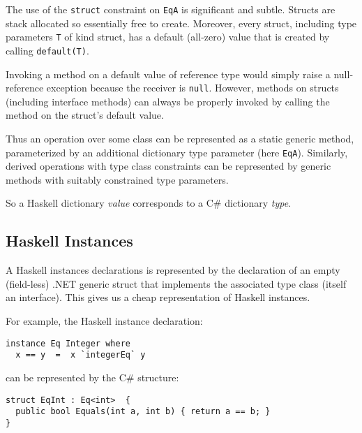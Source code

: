 \documentclass[preprint]{sig-alternate-05-2015}
\begin{document}
The use of the \lstinline{struct} constraint on \lstinline{EqA} is significant and subtle. Structs are stack allocated so essentially free to create.
Moreover, every struct, including type parameters \lstinline{T} of kind struct, has a default (all-zero) value that is created by 
calling \lstinline{default(T)}.

Invoking a method on a default value of reference type would simply raise a null-reference exception because the receiver is \lstinline{null}.
However, methods on structs (including interface methods) can always be properly invoked
by calling the method on the struct's default value. 

Thus an operation over some class can be represented as a static generic method, 
parameterized by an additional dictionary type parameter (here \lstinline{EqA}).
Similarly, derived operations with type class constraints can be represented by generic methods with suitably constrained type parameters.

So a Haskell dictionary \emph{value} corresponds to a  C\# dictionary \emph{type}.



\subsection{Haskell Instances}

A Haskell instances declarations is represented by the declaration of an empty (field-less) .NET generic struct that implements the associated type class (itself an interface).
This gives us a cheap representation of Haskell instances. 

For example, the Haskell instance declaration:
\begin{lstlisting}
instance Eq Integer where 
  x == y  =  x `integerEq` y
\end{lstlisting}

can be represented by the C\# structure:
\begin{lstlisting}
struct EqInt : Eq<int>  {
  public bool Equals(int a, int b) { return a == b; }  
}
\end{lstlisting}
\end{document}
